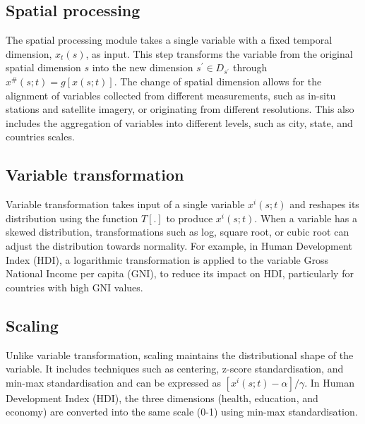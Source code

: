\documentclass[
]{interact}
\begin{document}
\hypertarget{spatial-processing}{%
\subsection{Spatial processing}\label{spatial-processing}}

The spatial processing module takes a single variable with a fixed
temporal dimension, \(x_t(s)\), as input. This step transforms the
variable from the original spatial dimension \(s\) into the new
dimension \(s^\prime \in D_{s^\prime}\) through
\(x^\#(s;t) = g[x(s;t)]\). The change of spatial dimension allows for
the alignment of variables collected from different measurements, such
as in-situ stations and satellite imagery, or originating from different
resolutions. This also includes the aggregation of variables into
different levels, such as city, state, and countries scales.

\hypertarget{variable-transformation}{%
\subsection{Variable transformation}\label{variable-transformation}}

Variable transformation takes input of a single variable \(x^i(s;t)\)
and reshapes its distribution using the function \(T[.]\) to produce
\(x^i(s;t)\). When a variable has a skewed distribution, transformations
such as log, square root, or cubic root can adjust the distribution
towards normality. For example, in Human Development Index (HDI), a
logarithmic transformation is applied to the variable Gross National
Income per capita (GNI), to reduce its impact on HDI, particularly for
countries with high GNI values.

\hypertarget{scaling}{%
\subsection{Scaling}\label{scaling}}

Unlike variable transformation, scaling maintains the distributional
shape of the variable. It includes techniques such as centering, z-score
standardisation, and min-max standardisation and can be expressed as
\([x^i(s;t) - \alpha]/\gamma\). In Human Development Index (HDI), the
three dimensions (health, education, and economy) are converted into the
same scale (0-1) using min-max standardisation.
\end{document}
